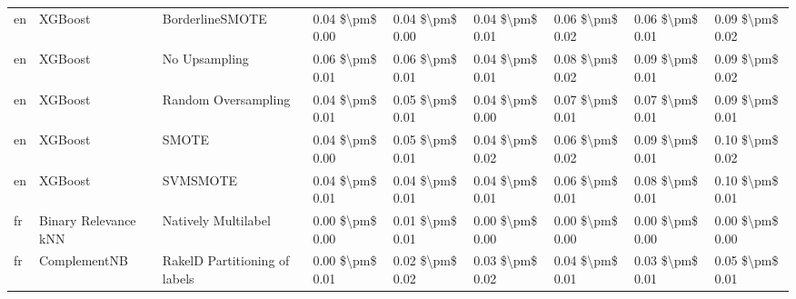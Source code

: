 \begin{tabular}{lllllllll}
      en &                         XGBoost &               BorderlineSMOTE & 0.04 \$\textbackslash pm\$ 0.00 &           0.04 \$\textbackslash pm\$ 0.00 &       0.04 \$\textbackslash pm\$ 0.01 &        0.06 \$\textbackslash pm\$ 0.02 &                         0.06 \$\textbackslash pm\$ 0.01 &     0.09 \$\textbackslash pm\$ 0.02 \\
      en &                         XGBoost &                 No Upsampling & 0.06 \$\textbackslash pm\$ 0.01 &           0.06 \$\textbackslash pm\$ 0.01 &       0.04 \$\textbackslash pm\$ 0.01 &        0.08 \$\textbackslash pm\$ 0.02 &                         0.09 \$\textbackslash pm\$ 0.01 &     0.09 \$\textbackslash pm\$ 0.02 \\
      en &                         XGBoost &           Random Oversampling & 0.04 \$\textbackslash pm\$ 0.01 &           0.05 \$\textbackslash pm\$ 0.01 &       0.04 \$\textbackslash pm\$ 0.00 &        0.07 \$\textbackslash pm\$ 0.01 &                         0.07 \$\textbackslash pm\$ 0.01 &     0.09 \$\textbackslash pm\$ 0.01 \\
      en &                         XGBoost &                         SMOTE & 0.04 \$\textbackslash pm\$ 0.00 &           0.05 \$\textbackslash pm\$ 0.01 &       0.04 \$\textbackslash pm\$ 0.02 &        0.06 \$\textbackslash pm\$ 0.02 &                         0.09 \$\textbackslash pm\$ 0.01 &     0.10 \$\textbackslash pm\$ 0.02 \\
      en &                         XGBoost &                      SVMSMOTE & 0.04 \$\textbackslash pm\$ 0.01 &           0.04 \$\textbackslash pm\$ 0.01 &       0.04 \$\textbackslash pm\$ 0.01 &        0.06 \$\textbackslash pm\$ 0.01 &                         0.08 \$\textbackslash pm\$ 0.01 &     0.10 \$\textbackslash pm\$ 0.01 \\
      fr &            Binary Relevance kNN &           Natively Multilabel & 0.00 \$\textbackslash pm\$ 0.00 &           0.01 \$\textbackslash pm\$ 0.01 &       0.00 \$\textbackslash pm\$ 0.00 &        0.00 \$\textbackslash pm\$ 0.00 &                         0.00 \$\textbackslash pm\$ 0.00 &     0.00 \$\textbackslash pm\$ 0.00 \\
      fr &                    ComplementNB & RakelD Partitioning of labels & 0.00 \$\textbackslash pm\$ 0.01 &           0.02 \$\textbackslash pm\$ 0.02 &       0.03 \$\textbackslash pm\$ 0.02 &        0.04 \$\textbackslash pm\$ 0.01 &                         0.03 \$\textbackslash pm\$ 0.01 &     0.05 \$\textbackslash pm\$ 0.01 \\

\end{tabular}
